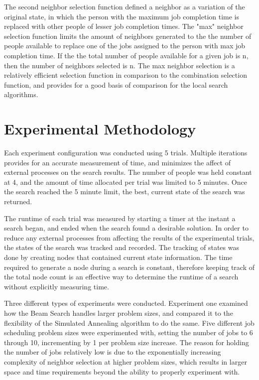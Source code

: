\documentclass[10pt, twocolumn]{article}
\begin{document}
The second neighbor selection function defined a neighbor as a variation of the original state, in which the person with the maximum job completion time is replaced with other people of lesser job completion times. The "max" neighbor selection function limits the amount of neighbors generated to the the number of people available to replace one of the jobs assigned to the person with max job completion time. If the the total number of people available for a given job is n, then the number of neighbors selected is n. The max neighbor selection is a relatively efficient selection function in comparison to the combination selection function, and provides for a good basis of comparison for the local search algorithms.


\section{Experimental Methodology}


Each experiment configuration was conducted using 5 trials. Multiple iterations provides for an accurate measurement of time, and minimizes the affect of external processes on the search results. The number of people was held constant at 4, and the amount of time allocated per trial was limited to 5 minutes. Once the search reached the 5 minute limit, the best, current state of the search was returned.

The runtime of each trial was measured by starting a timer at the instant a search began, and ended when the search found a desirable solution. In order to reduce any external processes from affecting the results of the experimental trials, the states of the search was tracked and recorded. The tracking of states was done by creating nodes that contained current state information. The time required to generate a node during a search is constant, therefore keeping track of the total node count is an effective way to determine the runtime of a search without explicitly measuring time.

Three different types of experiments were conducted. Experiment one examined how the Beam Search handles larger problem sizes, and compared it to the flexibility of the Simulated Annealing algorithm to do the same. Five different job scheduling problem sizes were experimented with, setting the number of jobs to 6 through 10, incrementing by 1 per problem size increase. The reason for holding the number of jobs relatively low is due to the exponentially increasing complexity of neighbor selection at higher problem sizes, which results in larger space and time requirements beyond the ability to properly experiment with.
\end{document}
